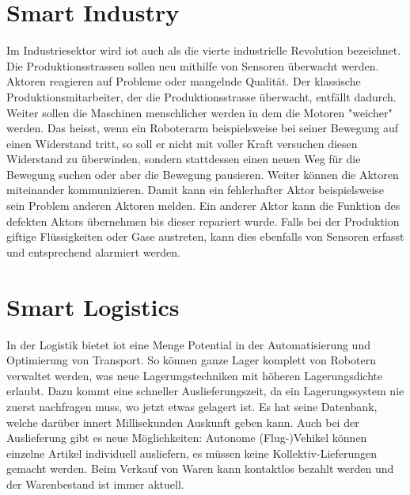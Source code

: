 \section{Smart Industry}
Im Industriesektor wird \gls{iot} auch als die vierte industrielle Revolution bezeichnet. Die Produktionsstrassen sollen neu mithilfe von Sensoren überwacht werden. Aktoren reagieren auf Probleme oder mangelnde Qualität. Der klassische Produktionsmitarbeiter, der die Produktionsstrasse überwacht, entfällt dadurch. Weiter sollen die Maschinen menschlicher werden in dem die Motoren "weicher" werden. Das heisst, wenn ein Roboterarm beispielsweise bei seiner Bewegung auf einen Widerstand tritt, so soll er nicht mit voller Kraft versuchen diesen Widerstand zu überwinden, sondern stattdessen einen neuen Weg für die Bewegung suchen oder aber die Bewegung pausieren. Weiter können die Aktoren miteinander kommunizieren. Damit kann ein fehlerhafter Aktor beispielsweise sein Problem anderen Aktoren melden. Ein anderer Aktor kann die Funktion des defekten Aktors übernehmen bis dieser repariert wurde. Falls bei der Produktion giftige Flüssigkeiten oder Gase austreten, kann dies ebenfalls von Sensoren erfasst und entsprechend alarmiert werden.

\section{Smart Logistics}
In der Logistik bietet \gls{iot} eine Menge Potential in der Automatisierung und Optimierung von Transport. So können ganze Lager komplett von Robotern verwaltet werden, was neue Lagerungstechniken mit höheren Lagerungsdichte erlaubt. Dazu kommt eine schneller Auslieferungszeit, da ein Lagerungssystem nie zuerst nachfragen muss, wo jetzt etwas gelagert ist. Es hat seine Datenbank, welche darüber innert Millisekunden Auskunft geben kann. Auch bei der Auslieferung gibt es neue Möglichkeiten: Autonome (Flug-)Vehikel können einzelne Artikel individuell ausliefern, es müssen keine Kollektiv-Lieferungen gemacht werden. Beim Verkauf von Waren kann kontaktlos bezahlt werden und der Warenbestand ist immer aktuell.

